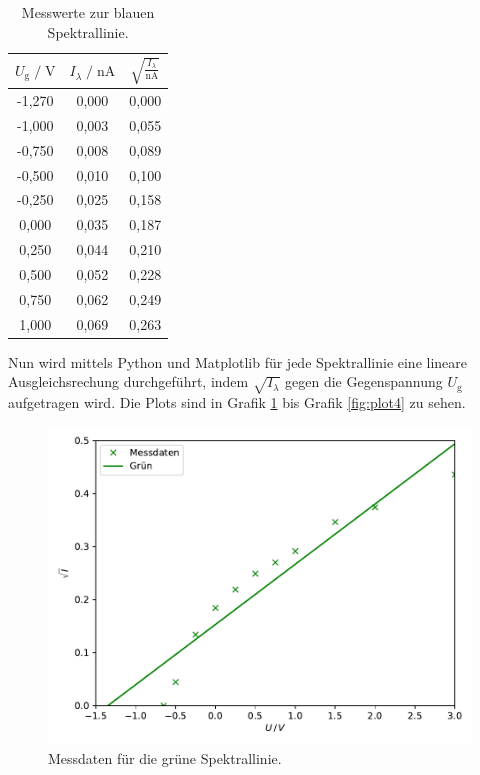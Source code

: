 \begin{table}
    \centering
    \caption{Messwerte zur blauen Spektrallinie.}
    \label{tab:blau}
    \begin{tabular}{c c c}
    \toprule
    $ U_\text{g} \;/\; \si{\volt} $ & $I_\lambda \;/\; \si{\nano\ampere}$ &
    $ \sqrt{\frac{I_\lambda}{\si{\nano\ampere}}}$\\
    \midrule 
      -1,270 & 0,000 & 0,000\\
      -1,000 & 0,003 & 0,055\\
      -0,750 & 0,008 & 0,089\\
      -0,500 & 0,010 & 0,100\\
      -0,250 & 0,025 & 0,158\\
       0,000 & 0,035 & 0,187\\
       0,250 & 0,044 & 0,210\\
       0,500 & 0,052 & 0,228\\
       0,750 & 0,062 & 0,249\\
       1,000 & 0,069 & 0,263\\ 
    \bottomrule
    \end{tabular}
\end{table}

Nun wird mittels Python und Matplotlib für jede Spektrallinie eine lineare Ausgleichsrechung durchgeführt, indem 
$\sqrt{I_\lambda}$ gegen die Gegenspannung $U_\text{g}$ aufgetragen wird. Die Plots sind in Grafik \ref{fig:plot1}
bis Grafik \ref{fig:plot4} zu sehen.

\begin{figure}
  \centering
  \includegraphics{content/plot1.pdf}
  \caption{Messdaten für die grüne Spektrallinie.}
  \label{fig:plot1}
\end{figure}

